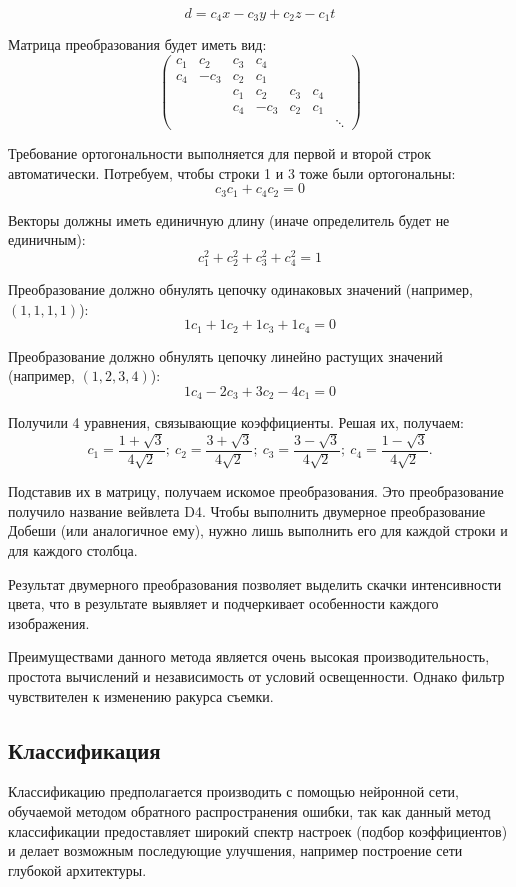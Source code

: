 $$
    d = c_4x - c_3y + c_2z - c_1t
$$

Матрица преобразования будет иметь вид:
$$
\begin{pmatrix}c_1 & c_2 & c_3 & c_4 & & & \\
c_4 & -c_3 & c_2 & c_1 & & & \\
& & c_1 & c_2 & c_3 & c_4 & \\
& & c_4 & -c_3 & c_2 & c_1 & \\
&&&&&& \ddots \end{pmatrix}
$$

Требование ортогональности выполняется для первой и второй строк автоматически. Потребуем, чтобы строки 1 и 3 тоже были
ортогональны:
$$
c_3c_1+c_4c_2=0
$$

Векторы должны иметь единичную длину (иначе определитель будет не единичным):
$$
c_1^2 + c_2^2+c_3^2+c_4^2 = 1
$$

Преобразование должно обнулять цепочку одинаковых значений (например, $(1, 1, 1, 1)$):
$$
    1c_1+1c_2+1c_3+1c_4=0
$$

Преобразование должно обнулять цепочку линейно растущих значений (например, $(1, 2, 3, 4)$):
$$
    1c_4-2c_3+3c_2-4c_1=0
$$

Получили 4 уравнения, связывающие коэффициенты. Решая их, получаем:
$$
    c_1=\frac{1+\sqrt{3}}{4\sqrt{2}};\ 
    c_2=\frac{3+\sqrt{3}}{4\sqrt{2}};\ 
    c_3=\frac{3-\sqrt{3}}{4\sqrt{2}};\ 
    c_4=\frac{1-\sqrt{3}}{4\sqrt{2}}.
$$

Подставив их в матрицу, получаем искомое преобразования.
Это преобразование получило название вейвлета D4\cite{vaivlet_1}.
Чтобы выполнить двумерное преобразование Добеши (или аналогичное ему), нужно лишь выполнить его для каждой строки и для каждого
столбца.

Результат двумерного преобразования позволяет выделить скачки интенсивности цвета,
что в результате выявляет и подчеркивает особенности каждого изображения.

Преимуществами данного метода является очень высокая производительность, простота вычислений и независимость
от условий освещенности.
Однако фильтр чувствителен к изменению ракурса съемки.

\subsection{Классификация}

Классификацию предполагается производить с помощью нейронной сети,
обучаемой методом обратного распространения ошибки, так как данный метод
классификации предоставляет широкий спектр настроек (подбор коэффициентов) и
делает возможным последующие улучшения, например построение сети глубокой
архитектуры.

